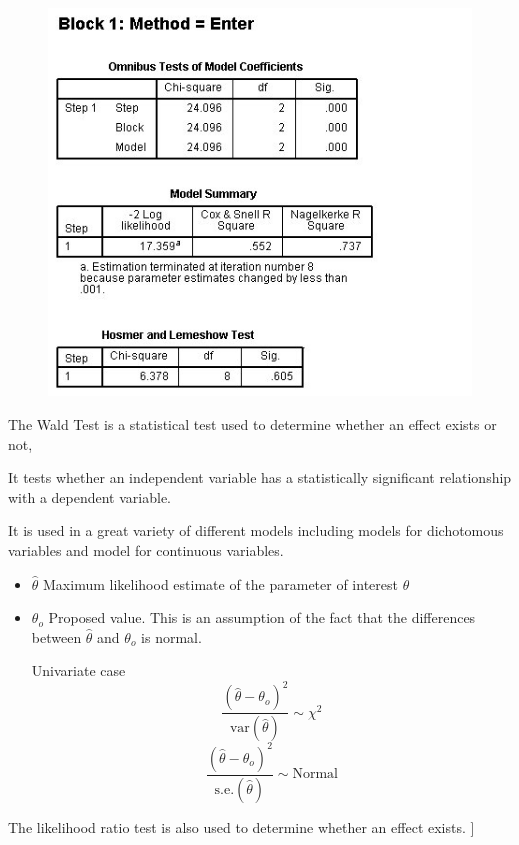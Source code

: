 \documentclass[a4paper,12pt]{article}
\begin{document}
\begin{figure}[h!]
	\centering
	\includegraphics[width=0.9\linewidth]{images/Logistic5}
\end{figure}










	
	The Wald Test is a statistical test used to determine whether an effect exists or not,
	
	It tests whether an independent variable has a statistically significant relationship with a dependent variable.
	
	It is used in a great variety of different models including models for dichotomous variables and model for continuous
	variables.
	
	\begin{itemize}
		\item $\hat{\theta}$ Maximum likelihood estimate of the parameter of interest $\theta$
		\item $\theta_o$ Proposed value.
		This is an assumption of the fact that the differences between $\hat{\theta}$ and $\theta_o$ is normal.
		
		Univariate case
		\[ \frac{(\hat{\theta} - \theta_o )^2}{\mbox{var}(\hat{\theta})} \sim \chi^2 \]
		\[ \frac{(\hat{\theta} - \theta_o )^2}{\mbox{s.e.}(\hat{\theta})} \sim \mbox{Normal} \]
	\end{itemize}	
	The likelihood ratio test is also used to determine whether an effect exists.
	]
\newpage
\end{document}
